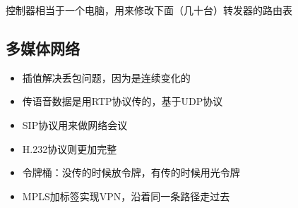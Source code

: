 \begin{center}
\end{center}

控制器相当于一个电脑，用来修改下面（几十台）转发器的路由表

\subsection{多媒体网络}
\begin{itemize}
\item 插值解决丢包问题，因为是连续变化的
\item 传语音数据是用RTP协议传的，基于UDP协议
\item SIP协议用来做网络会议
\item H.232协议则更加完整
\item 令牌桶：没传的时候放令牌，有传的时候用光令牌
\item MPLS加标签实现VPN，沿着同一条路径走过去
\end{itemize}
